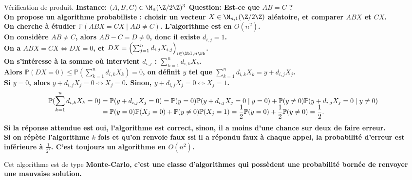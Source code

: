 \documentclass[french, 11pt]{article}
\begin{document}


\renewcommand*{\E}{\mathbb{E}}
\renewcommand*{\P}{\mathbb{P}}

\begin{ex}{Vérification de produit.}{}
    \bf{Instance:} $(A,B,C)\in\M_n(\Z/2\Z)^3$ \hspace*{2em} \bf{Question:} Est-ce que $AB=C$ ?\\
    On propose un algorithme probabiliste : choisir un vecteur $X\in\M_{n,1}(\Z/2\Z)$ aléatoire, et comparer $ABX$ et $CX$.\\
    On cherche à étudier $\P(ABX=CX\mid AB\neq C)$. L'algorithme est en $O(n^2)$.\\
    On considère $AB\neq C$, alors $AB-C=D\neq0$, donc il existe $d_{i,j}=1$.\\
    On a $ABX=CX \iff DX = 0$, et $DX=\left( \sum_{j=1}^n d_{i,j}X_{i,j} \right)_{i\in\lb1,n\rb}$.\\
    On s'intéresse à la somme où intervient $d_{i,j}$ : $\sum_{k=1}^nd_{i,k}X_k$.\\
    Alors $\P(DX=0)\leq\P(\sum_{k=1}^nd_{i,k}X_k)=0$, on définit $y$ tel que $\sum_{k=1}^nd_{i,k}X_k=y+d_{i,j}X_j$.\\
    Si $y=0$, alors $y+d_{i,j}X_j = 0 \iff X_j = 0$. Sinon, $y+d_{i,j}X_j=0\iff X_j=1$.
    \begin{align*}\vspace*{-0.7cm}
        \P(\sum_{k=1}^nd_{i,k}X_k=0) &= \P(y+d_{i,j}X_j=0) = \P(y=0)\P(y+ d_{i,j}X_j=0\mid y=0)+ \P(y\neq0)\P(y+d_{i,j}X_j=0\mid y\neq0)\\[-0.5cm]
        &=\P(y=0)\P(X_j=0) + \P(y\neq0)\P(X_j=1) = \frac{1}{2}\P(y=0)+\frac{1}{2}\P(y\neq0)=\frac{1}{2}.
    \end{align*}
    Si la réponse attendue est oui, l'algorithme est correct, sinon, il a moins d'une chance sur deux de faire erreur.\\
    Si on répète l'algorithme $k$ fois et qu'on renvoie faux ssi il a répondu faux à chaque appel, la probabilité d'erreur est inférieure à $\frac{1}{2^k}$. C'est toujours un algorithme en $O(n^2)$.
\end{ex}

\vspace*{-0.7cm}

\begin{defi}{}{}
    Cet algorithme est de type \bf{Monte-Carlo}, c'est une classe d'algorithmes qui possèdent une probabilité bornée de renvoyer une mauvaise solution. 
\end{defi}
\end{document}
